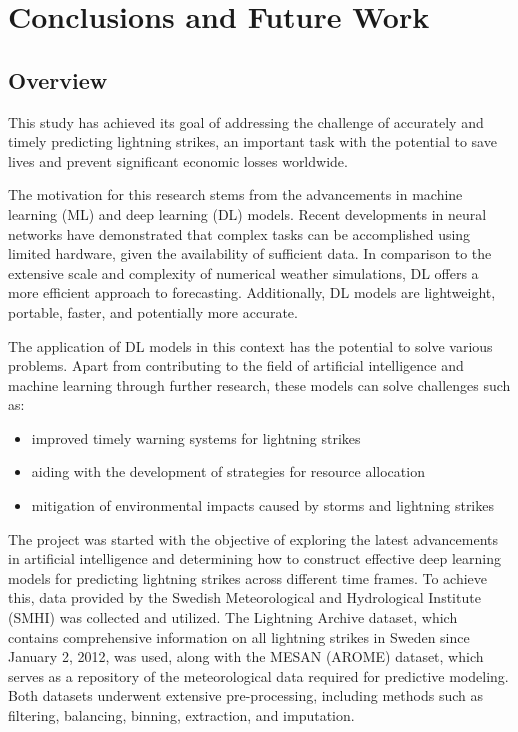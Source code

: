 \chapter{Conclusions and Future Work}
\label{sec:conclusions}

\section{Overview}


This study has achieved its goal of addressing the challenge of accurately and timely predicting lightning strikes, an important task with the potential to save lives and prevent significant economic losses worldwide.

The motivation for this research stems from the advancements in machine learning (ML) and deep learning (DL) models. Recent developments in neural networks have demonstrated that complex tasks can be accomplished using limited hardware, given the availability of sufficient data. In comparison to the extensive scale and complexity of numerical weather simulations, DL offers a more efficient approach to forecasting. Additionally, DL models are lightweight, portable, faster, and potentially more accurate.

The application of DL models in this context has the potential to solve various problems. Apart from contributing to the field of artificial intelligence and machine learning through further research, these models can solve challenges such as:

\begin{itemize}
	\item improved timely warning systems for lightning strikes
	\item aiding with the development of strategies for resource allocation
	\item mitigation of environmental impacts caused by storms and lightning strikes
\end{itemize}


The project was started with the objective of exploring the latest advancements in artificial intelligence and determining how to construct effective deep learning models for predicting lightning strikes across different time frames. To achieve this, data provided by the Swedish Meteorological and Hydrological Institute (SMHI) was collected and utilized. The Lightning Archive dataset, which contains comprehensive information on all lightning strikes in Sweden since January 2, 2012, was used, along with the MESAN (AROME) dataset, which serves as a repository of the meteorological data required for predictive modeling. Both datasets underwent extensive pre-processing, including methods such as filtering, balancing, binning, extraction, and imputation.

